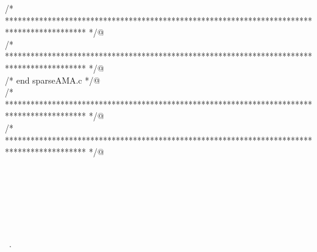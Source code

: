 \documentclass[12pt]{article}
\begin{document}
\begin{flushleft}
\begin{minipage}{\linewidth}
\begin{list}{}{}
\mbox{}\verb@@\\
\mbox{}\verb@@\\
\mbox{}\verb@@\\
\mbox{}\verb@@\\
\mbox{}\verb@@\\
\mbox{}\verb@/* ******************************************************************************************* */@\\
\mbox{}\verb@/* ******************************************************************************************* */@\\
\mbox{}\verb@/*                               end sparseAMA.c                                               */@\\
\mbox{}\verb@/* ******************************************************************************************* */@\\
\mbox{}\verb@/* ******************************************************************************************* */@\\
\mbox{}\verb@@\\
\mbox{}\verb@@\\
\mbox{}\verb@@\\
\mbox{}\verb@@\\
\mbox{}\verb@@\\
\mbox{}\verb@@\\
\mbox{}\verb@@{\NWsep}
\end{list}
\vspace{-1.5ex}
\footnotesize
\begin{list}{}{\setlength{\itemsep}{-\parsep}\setlength{\itemindent}{-\leftmargin}}
\item \NWtxtFileDefBy\ .

\item{}
\end{list}
\end{minipage}\vspace{4ex}
\end{flushleft}
\end{document}

